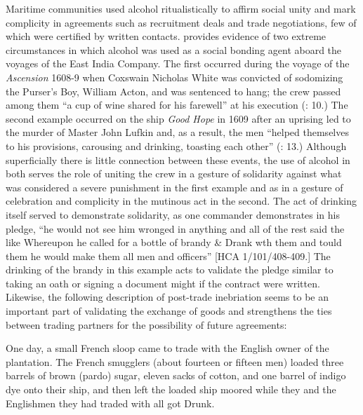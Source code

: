   Maritime communities used alcohol ritualistically to affirm social unity and mark complicity in agreements such as recruitment deals and trade negotiations, few of which were certified by written contacts. \citet{Fury2015} provides evidence of two extreme circumstances in which alcohol was used as a social bonding agent aboard the voyages of the East India Company. The first occurred during the voyage of the \textit{Ascension} 1608-9 when Coxswain Nicholas White was convicted of sodomizing the Purser’s Boy, William Acton, and was sentenced to hang; the crew passed among them “a cup of wine shared for his farewell” at his execution (\citealt{Fury2015}: 10.) The second example occurred on the ship \textit{Good Hope} in 1609 after an uprising led to the murder of Master John Lufkin and, as a result, the men “helped themselves to his provisions, carousing and drinking, toasting each other” (\citealt{Fury2015}: 13.) Although superficially there is little connection between these events, the use of alcohol in both serves the role of uniting the crew in a gesture of solidarity against what was considered a severe punishment in the first example and as in a gesture of celebration and complicity in the mutinous act in the second. The act of drinking itself served to demonstrate solidarity, as one commander demonstrates in his pledge, “he would not see him wronged in anything and all of the rest said the like Whereupon he called for a bottle of brandy \& Drank wth them and tould them he would make them all men and officers” [HCA 1/101/408-409.] The drinking of the brandy in this example acts to validate the pledge similar to taking an oath or signing a document might if the contract were written. Likewise, the following description of post-trade inebriation seems to be an important part of validating the exchange of goods and strengthens the ties between trading partners for the possibility of future agreements:

One day, a small French sloop came to trade with the English owner of the plantation.  The French smugglers (about fourteen or fifteen men) loaded three barrels of brown (pardo) sugar, eleven sacks of cotton, and one barrel of indigo dye onto their ship, and then left the loaded ship moored while they and the Englishmen they had traded with all got Drunk. \citep[15]{Hatfield2016} 


